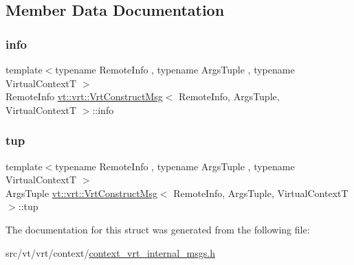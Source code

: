 \subsection{Member Data Documentation}
\mbox{\label{structvt_1_1vrt_1_1_vrt_construct_msg_a570a118633d088ea4b0cae7e0edfb716}} 
\subsubsection{\texorpdfstring{info}{info}}
{\footnotesize\ttfamily template$<$typename Remote\+Info , typename Args\+Tuple , typename Virtual\+ContextT $>$ \\
Remote\+Info \hyperlink{structvt_1_1vrt_1_1_vrt_construct_msg}{vt\+::vrt\+::\+Vrt\+Construct\+Msg}$<$ Remote\+Info, Args\+Tuple, Virtual\+ContextT $>$\+::info}

\mbox{\label{structvt_1_1vrt_1_1_vrt_construct_msg_a5d74ba39e846fba16e6cc83c33c21fe2}} 
\subsubsection{\texorpdfstring{tup}{tup}}
{\footnotesize\ttfamily template$<$typename Remote\+Info , typename Args\+Tuple , typename Virtual\+ContextT $>$ \\
Args\+Tuple \hyperlink{structvt_1_1vrt_1_1_vrt_construct_msg}{vt\+::vrt\+::\+Vrt\+Construct\+Msg}$<$ Remote\+Info, Args\+Tuple, Virtual\+ContextT $>$\+::tup}



The documentation for this struct was generated from the following file\+:\begin{DoxyCompactItemize}
\item 
src/vt/vrt/context/\hyperlink{context__vrt__internal__msgs_8h}{context\+\_\+vrt\+\_\+internal\+\_\+msgs.\+h}\end{DoxyCompactItemize}
